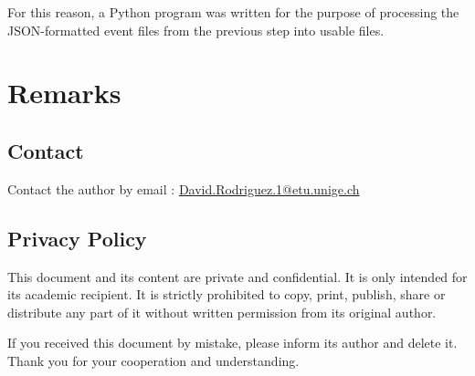 \documentclass[11pt]{article}
\begin{document}
For this reason, a Python program was written for the purpose of processing the JSON-formatted event files from the previous step into usable files.




\newpage
\section{Remarks}

\subsection{Contact}

Contact the author by email : \href{mailto:David.Rodriguez.1@etu.unige.ch}{David.Rodriguez.1@etu.unige.ch}

\subsection{Privacy Policy}
\label{sec:privacypolice}

This document and its content are private and confidential. It is only intended for its academic recipient. It is strictly prohibited to copy, print, publish, share or distribute any part of it without written permission from its original author.

If you received this document by mistake, please inform its author and delete it. Thank you for your cooperation and understanding.
\end{document}
